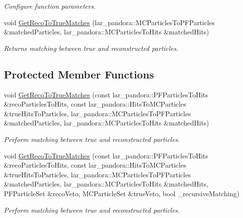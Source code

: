 \begin{DoxyCompactItemize}
\begin{DoxyCompactList}\small\item\em Configure function parameters. \end{DoxyCompactList}\item 
void \hyperlink{classubxsec_1_1McPfpMatch_a1b66ef44f3a1772a4e72de2e5066768c}{Get\-Reco\-To\-True\-Matches} (lar\-\_\-pandora\-::\-M\-C\-Particles\-To\-P\-F\-Particles \&matched\-Particles, lar\-\_\-pandora\-::\-M\-C\-Particles\-To\-Hits \&matched\-Hits)
\begin{DoxyCompactList}\small\item\em Returns matching between true and reconstructed particles. \end{DoxyCompactList}\end{DoxyCompactItemize}
\subsection*{Protected Member Functions}
\begin{DoxyCompactItemize}
\item 
void \hyperlink{classubxsec_1_1McPfpMatch_adb5138d94990f679643372e0be273940}{Get\-Reco\-To\-True\-Matches} (const lar\-\_\-pandora\-::\-P\-F\-Particles\-To\-Hits \&reco\-Particles\-To\-Hits, const lar\-\_\-pandora\-::\-Hits\-To\-M\-C\-Particles \&true\-Hits\-To\-Particles, lar\-\_\-pandora\-::\-M\-C\-Particles\-To\-P\-F\-Particles \&matched\-Particles, lar\-\_\-pandora\-::\-M\-C\-Particles\-To\-Hits \&matched\-Hits)
\begin{DoxyCompactList}\small\item\em Perform matching between true and reconstructed particles. \end{DoxyCompactList}\item 
void \hyperlink{classubxsec_1_1McPfpMatch_a0d41e3e0c60f2777cc26ca8b8520e9d2}{Get\-Reco\-To\-True\-Matches} (const lar\-\_\-pandora\-::\-P\-F\-Particles\-To\-Hits \&reco\-Particles\-To\-Hits, const lar\-\_\-pandora\-::\-Hits\-To\-M\-C\-Particles \&true\-Hits\-To\-Particles, lar\-\_\-pandora\-::\-M\-C\-Particles\-To\-P\-F\-Particles \&matched\-Particles, lar\-\_\-pandora\-::\-M\-C\-Particles\-To\-Hits \&matched\-Hits, P\-F\-Particle\-Set \&reco\-Veto, M\-C\-Particle\-Set \&true\-Veto, bool \-\_\-recursive\-Matching)
\begin{DoxyCompactList}\small\item\em Perform matching between true and reconstructed particles. \end{DoxyCompactList}\end{DoxyCompactItemize}
